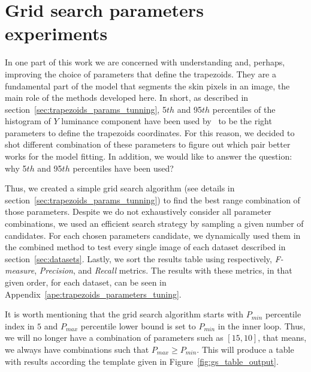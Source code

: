 \section{Grid search parameters experiments}
\label{sec:grid_search_experiments}
In one part of this work we are concerned with understanding and, perhaps, improving the choice of parameters that define the trapezoids. They are a fundamental part of the model that segments the skin pixels in an image, the main role of the methods developed here. In short, as described in section~\ref{sec:trapezoids_params_tunning}, 5${th}$ and 95$th$ percentiles of the histogram of $Y$ luminance component have been used by~\citet{brancati:17} to be the right parameters to define the trapezoids coordinates. For this reason, we decided to shot different combination of these parameters to figure out which pair better works for the model fitting. In addition, we would like to answer the question: why 5${th}$ and 95$th$ percentiles have been used?

Thus, we created a simple grid search algorithm (see details in section~\ref{sec:trapezoids_params_tunning}) to find the best range combination of those parameters. Despite we do not exhaustively consider all parameter combinations, we used an efficient search strategy by sampling a given number of candidates. For each chosen parameters candidate, we dynamically used them in the combined method to test every single image of each dataset described in section~\ref{sec:datasets}. Lastly, we sort the results table using respectively, \emph{F-measure}, \emph{Precision}, and \emph{Recall} metrics. The results with these metrics, in that given order, for each dataset, can be seen in Appendix~\ref{ape:trapezoids_parameters_tuning}.

It is worth mentioning that the grid search algorithm starts with $P_{min}$ percentile index in $5$ and $P_{max}$ percentile lower bound is set to $P_{min}$ in the inner loop. Thus, we will no longer have a combination of parameters such as $[15, 10]$, that means, we always have combinations such that $P_{max} \geq P_{min}$. This will produce a table with results according the template given in Figure~\ref{fig:gs_table_output}.

